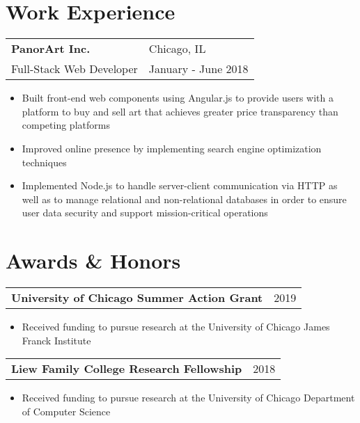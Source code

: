 \documentclass[letterpaper, 12pt]{article}
\begin{document}
\section{Work Experience}
\vspace{5pt}
\begin{tabular}{@{} L{12cm} @{} R{4.51cm} @{}}
  \textbf{PanorArt Inc.} & Chicago, IL \\
  Full-Stack Web Developer & January - June 2018 \\
\end{tabular}
\vspace{-10pt}
\begin{itemize}
  \item Built front-end web components using Angular.js to provide users with a platform to buy and sell art that achieves greater price transparency than competing platforms
  \item Improved online presence by implementing search engine optimization techniques
  \item Implemented Node.js to handle server-client communication via HTTP as well as to manage relational and non-relational databases in order to ensure user data security and support mission-critical operations
\end{itemize}
\vspace{5pt}


\section{Awards \& Honors}
\vspace{5pt}
\begin{tabular}{@{} L{12cm} @{} R{4.51cm} @{}}
  \textbf{University of Chicago Summer Action Grant} & 2019 \\
\end{tabular}
\vspace{-20pt}
\begin{itemize}
  \item Received funding to pursue research at the University of Chicago James Franck Institute
\end{itemize}

\begin{tabular}{@{} L{12cm} @{} R{4.51cm} @{}}
  \textbf{Liew Family College Research Fellowship} & 2018 \\
\end{tabular}
\vspace{-20pt}
\begin{itemize}
  \item Received funding to pursue research at the University of Chicago Department of Computer Science
\end{itemize}
\end{document}
